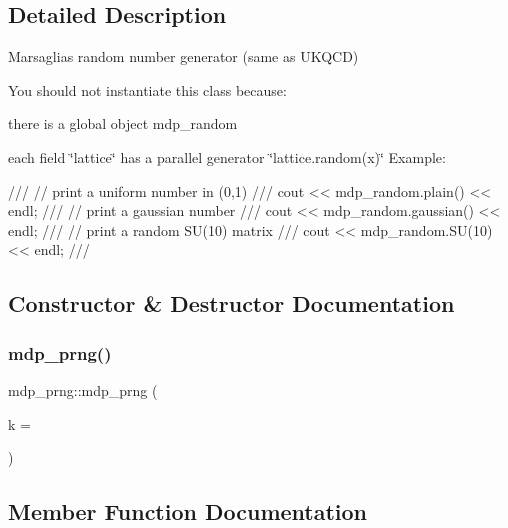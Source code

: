 \subsection{Detailed Description}
Marsaglia\textquotesingle{}s random number generator (same as U\+K\+Q\+CD) 

You should not instantiate this class because\+:
\begin{DoxyItemize}
\item there is a global object mdp\+\_\+random
\item each field \char`\"{}lattice\char`\"{} has a parallel generator \char`\"{}lattice.\+random(x)\char`\"{} Example\+: \begin{DoxyVerb}///    // print a uniform number in (0,1)
///    cout << mdp_random.plain() << endl;
///    // print a gaussian number
///    cout << mdp_random.gaussian() << endl;
///    // print a random SU(10) matrix
///    cout << mdp_random.SU(10) << endl;
/// \end{DoxyVerb}
 
\end{DoxyItemize}

\subsection{Constructor \& Destructor Documentation}
\mbox{\label{classmdp__prng_a57739df3a7629078ca66dbfd7ded1b86}} 
\subsubsection{\texorpdfstring{mdp\+\_\+prng()}{mdp\_prng()}}
{\footnotesize\ttfamily mdp\+\_\+prng\+::mdp\+\_\+prng (\begin{DoxyParamCaption}\item[{\hyperlink{mdp__global__vars_8h_aaa1ad9d0dcd2124aa5af0120d9954174}{mdp\+\_\+int}}]{k = {} }\end{DoxyParamCaption})\hspace{0.3cm}{\ttfamily [inline]}}



\subsection{Member Function Documentation}
\mbox{\label{classmdp__prng_a2ba8807aa153b9b222d6d724da06dfdd}} 
